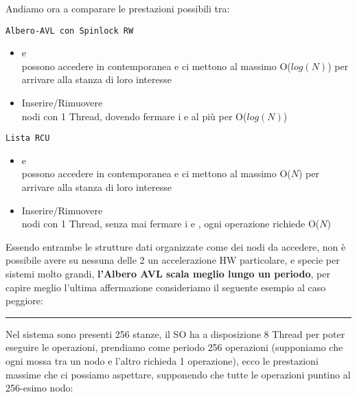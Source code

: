 Andiamo ora a comparare le prestazioni possibili tra:

\begin{minipage}{0.45\linewidth}
\begin{center}
\texttt{Albero-AVL con Spinlock RW}
\end{center}

\begin{itemize}
 \item[\faSmileO] \Writer e \Reader\\
possono accedere in contemporanea e ci mettono al {\color{red}massimo O($log(N)$)} per arrivare alla stanza di loro
interesse
\item[\faMehO\faFrownO\faSmileO] Inserire/Rimuovere\\
nodi con {\color{orange}1 Thread}, dovendo fermare i \Writer e \Reader al più per {\color{red}O($log(N)$)}

\end{itemize}
\end{minipage}
\hfill
\begin{minipage}{0.45\linewidth}
\begin{center}
\texttt{Lista RCU}
\end{center}

\begin{itemize}
 \item[\faFrownO] \Writer e \Reader\\
possono accedere in contemporanea e ci mettono al {\color{red}massimo O($N$)} per arrivare alla stanza di loro
interesse
 \item[\faMehO\faSmileO\faFrownO] Inserire/Rimuovere\\
nodi con {\color{orange}1 Thread}, senza mai fermare i \Writer e \Reader, ogni operazione richiede
{\color{red}O($N$)}
\end{itemize}
\end{minipage}

Essendo entrambe le strutture dati organizzate come dei nodi da accedere, non è possibile avere su nessuna delle 2 un
accelerazione HW particolare, e specie per sistemi molto grandi, \textbf{l'Albero AVL scala meglio lungo un periodo},
per capire meglio l'ultima affermazione consideriamo il seguente esempio al caso peggiore:

\rule{\linewidth}{0.5pt}
Nel sistema sono presenti {\color{teal}256 stanze}, il SO ha a disposizione {\color{teal}8 Thread} per
poter eseguire le operazioni, prendiamo come periodo {\color{teal}256 operazioni} (supponiamo che ogni
mossa tra un nodo e l'altro richieda 1 operazione), ecco le prestazioni massime che ci possiamo aspettare, supponendo
che tutte le operazioni puntino al 256-esimo nodo:

